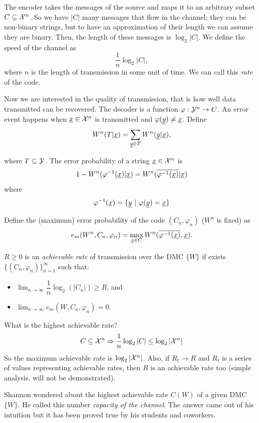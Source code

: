 The encoder takes the messages of the source and maps it to an arbitrary subset $C \subseteq \mathcal{X}^n$. So we have $|C|$ many messages that flow in the channel; they can be non-binary strings, but to have an approximation of their length we can assume they are binary. Then, the length of these messages is $\log_2|C|$. We define the speed of the channel as $$\dfrac{1}{n}\log_2|C|,$$ where $n$ is the length of transmission in some unit of time. We can call this \emph{rate} of the code.

Now we are interested in the quality of transmission, that is how well data transmitted can be recovered. The decoder is a function $\varphi: \mathcal{Y}^n \rightarrow C$. An error event happens when $\underline{x} \in \mathcal{X}^n$ is transmitted and $\varphi(\underline{y}) \not= \underline{x}$. Define $$W^n(T|\underline{x}) = \sum_{\underline{y} \in T}W^n(\underline{y}|\underline{x}),$$

where $T \subseteq \mathcal{Y}$. The error probability of a string $\underline{x} \in \mathcal{X}^n$ is $$1 - W^n(\varphi^{-1}(\underline{x})|\underline{x}) = W^n(\overline{\varphi^{-1}(\underline{x})}|\underline{x})$$ where $$\varphi^{-1}(\str{x}) = \{\str{y}\ |\ \varphi(\str{y}) = \str{x} \}$$

Define the (maximum) error probability of the code $(C_n, \varphi_n)$ ($W^n$ is fixed) as 
\[
e_m(W^n, C_n, \varphi_n) = \max_{\underline{x} \in C} W^n(\overline{\varphi^{-1}(\underline{x})}, \underline{x}).
\]

\begin{prop}
	$R \geq 0$ is an \emph{achievable rate} of transmission over the DMC $\{W\}$ if exists $\{(C_n, \varphi_n)\}_{n=1}^\infty$ such that:
	\begin{itemize}
		\item $\lim_{n \rightarrow \infty} \dfrac{1}{n}\log_2(|C_n|) \geq R$, and
		\item $\lim_{n \rightarrow \infty} e_m(W, C_n, \varphi_n) = 0$.
	\end{itemize}
\end{prop}

What is the highest achievable rate? $$C \subseteq \mathcal{X}^n \Rightarrow \dfrac{1}{n}\log_2|C| \leq \log_2|\mathcal{X}^n|$$
So the maximum achievable rate is $\log_2|\mathcal{X}^n|$. Also, if $R_t \rightarrow R$ and $R_t$ is a series of values representing achievable rates, then $R$ is an achievable rate too (simple analysis, will not be demonstrated).

Shannon wondered about the highest achievable rate $C(W)$ of a given DMC $\{W\}$. He called this number \emph{capacity of the channel}. The answer came out of his intuition but it has been proved true by his students and coworkers.

